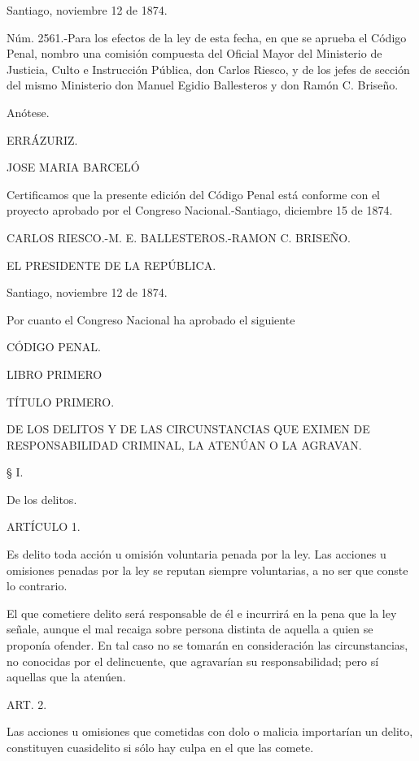 Santiago, noviembre 12 de 1874.

    Núm. 2561.-Para los efectos de la ley de esta fecha, en que se aprueba el Código Penal, nombro una comisión compuesta del Oficial Mayor del Ministerio de Justicia, Culto e Instrucción Pública, don Carlos Riesco, y de los jefes de sección del mismo Ministerio don Manuel Egidio Ballesteros y don Ramón C. Briseño.

    Anótese.

    ERRÁZURIZ.

    JOSE MARIA BARCELÓ


    Certificamos que la presente edición del Código Penal está conforme con el proyecto aprobado por el Congreso Nacional.-Santiago, diciembre 15 de 1874.

    CARLOS RIESCO.-M. E. BALLESTEROS.-RAMON C. BRISEÑO.


    EL PRESIDENTE DE LA REPÚBLICA.

    Santiago, noviembre 12 de 1874.

    Por cuanto el Congreso Nacional ha aprobado el siguiente

    CÓDIGO PENAL.

    LIBRO PRIMERO





    TÍTULO PRIMERO.

DE LOS DELITOS Y DE LAS CIRCUNSTANCIAS QUE EXIMEN DE RESPONSABILIDAD CRIMINAL, LA ATENÚAN O LA AGRAVAN.





    § I.

    De los delitos.



    ARTÍCULO 1.

    Es delito toda acción u omisión voluntaria penada por la ley.
    Las acciones u omisiones penadas por la ley se reputan siempre voluntarias, a no ser que conste lo contrario.

    El que cometiere delito será responsable de él e incurrirá en la pena que la ley señale, aunque el mal recaiga sobre persona distinta de aquella a quien se proponía ofender. En tal caso no se tomarán en consideración las circunstancias, no conocidas por el delincuente, que agravarían su responsabilidad; pero sí aquellas que la atenúen.


    ART. 2.

    Las acciones u omisiones que cometidas con dolo o malicia importarían un delito, constituyen cuasidelito si sólo hay culpa en el que las comete.



